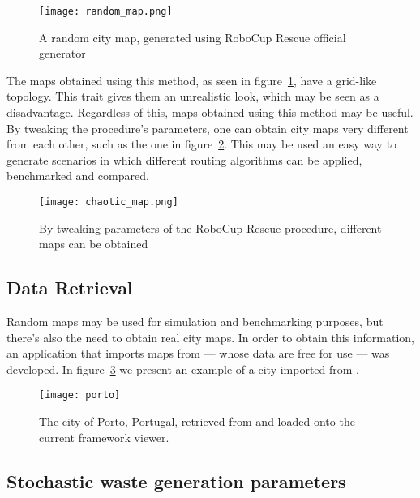 \begin{figure}[h]
\centering
\texttt{[image: random\_map.png]}
\caption{A random city map, generated using RoboCup Rescue official generator}
\label{fig:random_map}
\end{figure}

The maps obtained using this method, as seen in figure~\ref{fig:random_map},
have a grid-like topology. This trait gives them an unrealistic look, which may
be seen as a disadvantage. Regardless of this, maps obtained using this method
may be useful. By tweaking the procedure's parameters, one can obtain city maps
very different from each other, such as the one in
figure~\ref{fig:chaotic_map}. This may be used an easy way to generate
scenarios in which different routing algorithms can be applied, benchmarked and
compared.

\begin{figure}[h]
\centering
\texttt{[image: chaotic\_map.png]}
\caption{By tweaking parameters of the RoboCup Rescue procedure, different maps can be obtained}
\label{fig:chaotic_map}
\end{figure}



\subsection{\osm{} Data Retrieval}
\label{section:osm}

Random maps may be used for simulation and benchmarking purposes, but there's
also the need to obtain real city maps. In order to obtain this information, an
application that imports maps from \osm{} --- whose data are free for use ---
was developed.  In figure~\ref{fig:porto} we present an example of a city
imported from \osm{}.

\begin{figure}[th]
  \begin{center}
    \leavevmode
    \texttt{[image: porto]}
    \caption{The city of Porto, Portugal, retrieved from \osm{} and loaded onto the current framework viewer.}
    \label{fig:porto}
  \end{center}
\end{figure}



\subsection{Stochastic waste generation parameters}
\label{section:parameters}

